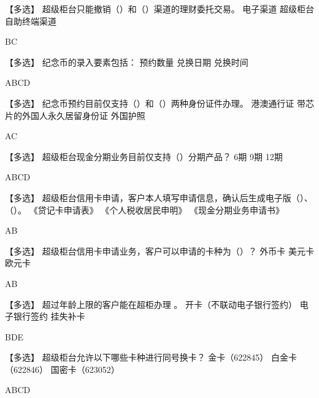 \documentclass[kindlepaper]{BHCexam4kindle}
\begin{document}
\begin{questions}
\qs 【多选】 超级柜台只能撤销（）和（）渠道的理财委托交易。 \xx
{} {  电子渠道 } { 超级柜台 } { 自助终端渠道 }
\begin{solution} BC \end{solution}
\qs 【多选】 纪念币的录入要素包括： \xx
{} {  预约数量 } { 兑换日期 } { 兑换时间 }
\begin{solution} ABCD \end{solution}
\qs 【多选】 纪念币预约目前仅支持（）和（）两种身份证件办理。 \xx
{} {  港澳通行证 } { 带芯片的外国人永久居留身份证 } { 外国护照 }
\begin{solution} AC \end{solution}
\qs 【多选】 超级柜台现金分期业务目前仅支持（）分期产品？ \xx
{} {  6期 } { 9期 } { 12期 }
\begin{solution} ABCD \end{solution}
\qs 【多选】 超级柜台信用卡申请，客户本人填写申请信息，确认后生成电子版（）、（）。 \xx
{} {  《贷记卡申请表》 } { 《个人税收居民申明》 } { 《现金分期业务申请书》 }
\begin{solution} AB \end{solution}
\qs 【多选】 超级柜台信用卡申请业务，客户可以申请的卡种为（）？ \xx
{} {  外币卡 } { 美元卡 } { 欧元卡 }
\begin{solution} AB \end{solution}
\qs 【多选】 超过年龄上限的客户能在超柜办理         。 \xx
{} {  开卡（不联动电子银行签约） } { 电子银行签约 } { 挂失补卡 }
\begin{solution} BDE \end{solution}
\qs 【多选】 超级柜台允许以下哪些卡种进行同号换卡？ \xx
{} {  金卡（622845） } { 白金卡（622846） } { 国密卡（623052） }
\begin{solution} ABCD \end{solution}

\end{questions}
\end{document}
